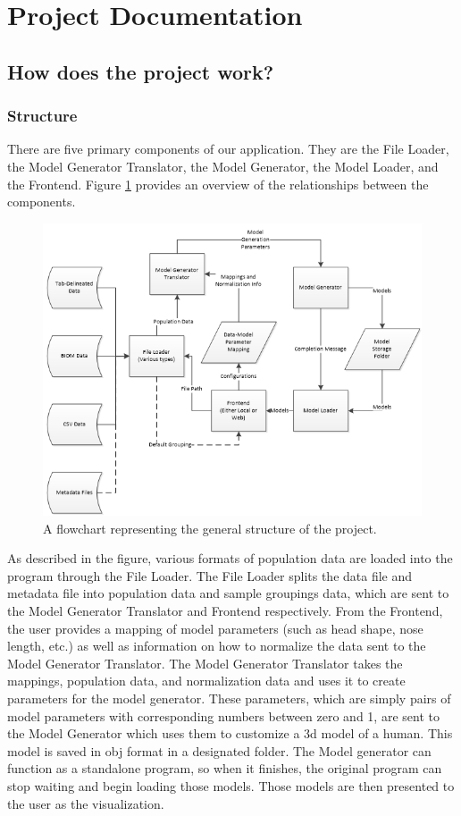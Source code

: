 \documentclass[letterpaper,10pt, onecolumn, draftclsnofoot]{IEEEtran}
\begin{document}
\section{Project Documentation}
\subsection{How does the project work?}
\subsubsection{Structure}

There are five primary components of our application. They are the File Loader, the Model Generator Translator, the Model Generator, the Model Loader, and the Frontend. Figure \ref{fig:structure2} provides an overview of the relationships between the components.

 \begin{figure}[h]
	\includegraphics[width=\textwidth]{structure.PNG}
	\caption{A flowchart representing the general structure of the project.}
	\label{fig:structure2}
\end{figure}

As described in the figure, various formats of population data are loaded into the program through the File Loader. The File Loader splits the data file and metadata file into population data and sample groupings data, which are sent to the Model Generator Translator and Frontend respectively. From the Frontend, the user provides a mapping of model parameters (such as head shape, nose length, etc.) as well as information on how to normalize the data sent to the Model Generator Translator. The Model Generator Translator takes the mappings, population data, and normalization data and uses it to create parameters for the model generator. These parameters, which are simply pairs of model parameters with corresponding numbers between zero and 1, are sent to the Model Generator which uses them to customize a 3d model of a human. This model is saved in obj format in a designated folder. The Model generator can function as a standalone program, so when it finishes, the original program can stop waiting and begin loading those models. Those models are then presented to the user as the visualization.
\end{document}

